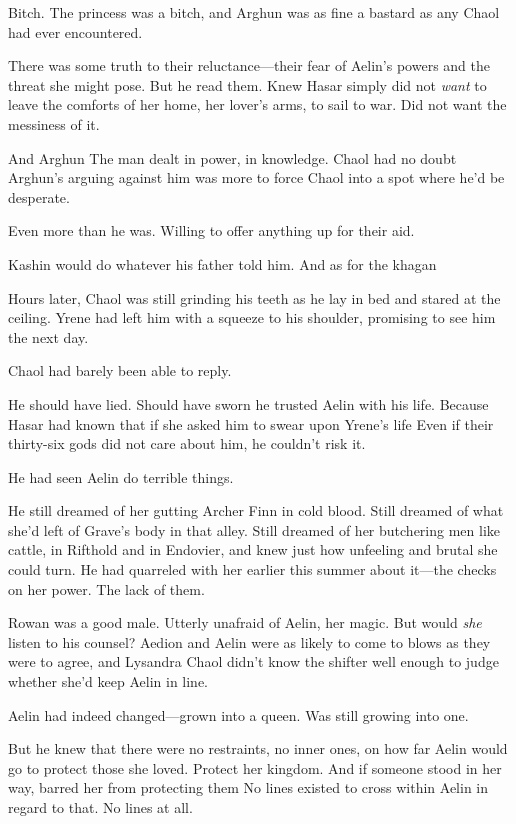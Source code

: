 Bitch. The princess was a bitch, and Arghun was as fine a bastard as any Chaol had ever encountered.

There was some truth to their reluctance---their fear of Aelin's powers and the threat she might pose. But he read them. Knew Hasar simply did not \emph{want} to leave the comforts of her home, her lover's arms, to sail to war. Did not want the messiness of it.

And Arghun  The man dealt in power, in knowledge. Chaol had no doubt Arghun's arguing against him was more to force Chaol into a spot where he'd be desperate.

Even more than he was. Willing to offer anything up for their aid.

Kashin would do whatever his father told him. And as for the khagan


Hours later, Chaol was still grinding his teeth as he lay in bed and stared at the ceiling. Yrene had left him with a squeeze to his shoulder, promising to see him the next day.

Chaol had barely been able to reply.

He should have lied. Should have sworn he trusted Aelin with his life. Because Hasar had known that if she asked him to swear upon Yrene's life
 Even if their thirty-six gods did not care about him, he couldn't risk it.

He had seen Aelin do terrible things.

He still dreamed of her gutting Archer Finn in cold blood. Still dreamed of what she'd left of Grave's body in that alley. Still dreamed of her butchering men like cattle, in Rifthold and in Endovier, and knew just how unfeeling and brutal she could turn. He had quarreled with her earlier this summer about it---the checks on her power. The lack of them.

Rowan was a good male. Utterly unafraid of Aelin, her magic. But would
\emph{she} listen to his counsel? Aedion and Aelin were as likely to come to blows as they were to agree, and Lysandra  Chaol didn't know the shifter well enough to judge whether she'd keep Aelin in line.

Aelin had indeed changed---grown into a queen. Was still growing into one.

But he knew that there were no restraints, no inner ones, on how far Aelin would go to protect those she loved. Protect her kingdom. And if someone stood in her way, barred her from protecting them  No lines existed to cross within Aelin in regard to that. No lines at all.

